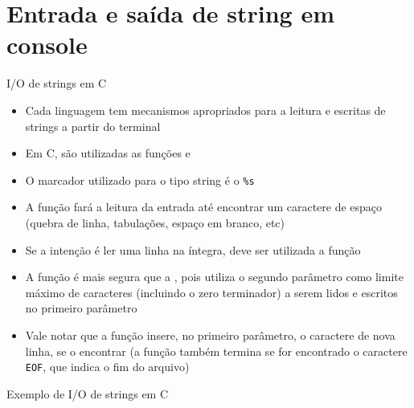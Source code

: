 \section{Entrada e saída de string em console}

\begin{frame}[fragile]{I/O de strings em C}

    \begin{itemize}
        \item Cada linguagem tem mecanismos apropriados para a leitura e escritas de strings a partir do terminal
        \pause

        \item Em C, são utilizadas as funções  e 
        \pause

        \item O marcador utilizado para o tipo string é o \verb|%s|
        \pause

        \item A função  fará a leitura da entrada até encontrar um caractere de 
            espaço (quebra de linha, tabulações, espaço em branco, etc)
        \pause

        \item Se a intenção é ler uma linha na íntegra, deve ser utilizada a função 
        \pause

        \item A função  é mais segura que a , pois utiliza o 
            segundo parâmetro como limite máximo de caracteres (incluindo o zero terminador) a serem 
            lidos e escritos no primeiro parâmetro
        \pause

        \item Vale notar que a função  insere, no primeiro parâmetro, o caractere 
            de nova linha, se o encontrar (a função também termina se for encontrado o caractere 
            \texttt{EOF}, que indica o fim do arquivo)
    \end{itemize}

\end{frame}

\begin{frame}[fragile]{Exemplo de I/O de strings em C}
\end{frame}

